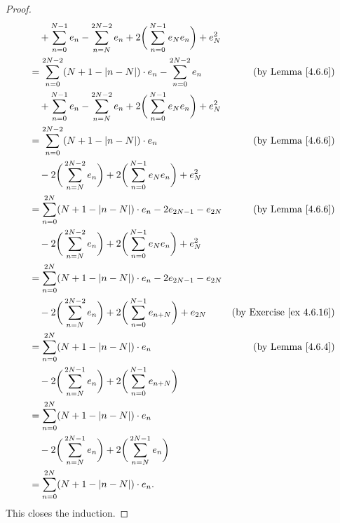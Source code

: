 \begin{proof}
\begin{align*}
         & \quad + \sum_{n = 0}^{N - 1} e_n - \sum_{n = N}^{2N - 2} e_n + 2 \bigg(\sum_{n = 0}^{N - 1} e_N e_n\bigg) + e_N^2                                        \\
         & = \sum_{n = 0}^{2N - 2} (N + 1 - \left\lvert n - N\right\rvert) \cdot e_n - \sum_{n = 0}^{2N - 2} e_n                               & \text{(by Lemma \ref{4.6.6})}        \\
         & \quad + \sum_{n = 0}^{N - 1} e_n - \sum_{n = N}^{2N - 2} e_n + 2 \bigg(\sum_{n = 0}^{N - 1} e_N e_n\bigg) + e_N^2                                        \\
         & = \sum_{n = 0}^{2N - 2} (N + 1 - \left\lvert n - N\right\rvert) \cdot e_n                                                           & \text{(by Lemma \ref{4.6.6})}        \\
         & \quad - 2 \bigg(\sum_{n = N}^{2N - 2} e_n\bigg) + 2 \bigg(\sum_{n = 0}^{N - 1} e_N e_n\bigg) + e_N^2                                                     \\
         & = \sum_{n = 0}^{2N} (N + 1 - \left\lvert n - N\right\rvert) \cdot e_n - 2 e_{2N - 1} - e_{2N}                                       & \text{(by Lemma \ref{4.6.6})}        \\
         & \quad - 2 \bigg(\sum_{n = N}^{2N - 2} e_n\bigg) + 2 \bigg(\sum_{n = 0}^{N - 1} e_N e_n\bigg) + e_N^2                                                     \\
         & = \sum_{n = 0}^{2N} (N + 1 - \left\lvert n - N\right\rvert) \cdot e_n - 2 e_{2N - 1} - e_{2N}                                                                              \\
         & \quad - 2 \bigg(\sum_{n = N}^{2N - 2} e_n\bigg) + 2 \bigg(\sum_{n = 0}^{N - 1} e_{n + N}\bigg) + e_{2N}           & \text{(by Exercise \ref{ex 4.6.16})} \\
         & = \sum_{n = 0}^{2N} (N + 1 - \left\lvert n - N\right\rvert) \cdot e_n                                                               & \text{(by Lemma \ref{4.6.4})}        \\
         & \quad - 2 \bigg(\sum_{n = N}^{2N - 1} e_n\bigg) + 2 \bigg(\sum_{n = 0}^{N - 1} e_{n + N}\bigg)                                                           \\
         & = \sum_{n = 0}^{2N} (N + 1 - \left\lvert n - N\right\rvert) \cdot e_n                                                                                                      \\
         & \quad - 2 \bigg(\sum_{n = N}^{2N - 1} e_n\bigg) + 2 \bigg(\sum_{n = N}^{2N - 1} e_n\bigg)                                                                \\
         & = \sum_{n = 0}^{2N} (N + 1 - \left\lvert n - N\right\rvert) \cdot e_n.
    \end{align*}
    This closes the induction.


\end{proof}
